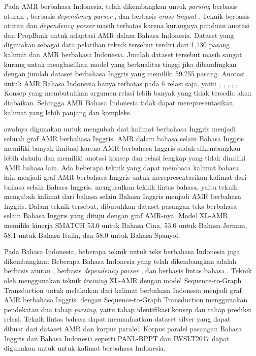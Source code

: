 Pada \gls{AMR} berbahasa Indonesia, telah dikembangkan untuk \textit{parsing} berbasis aturan , berbasis \textit{dependency parser} , dan berbasis \textit{cross-lingual} .
Teknik \amrparsing{} berbasis aturan dan \textit{dependency parser} masih terbatas karena kurangnya panduan anotasi dan PropBank untuk adaptasi \gls{AMR} dalam Bahasa Indonesia.
Dataset yang digunakan sebagai data pelatihan teknik tersebut terdiri dari 1,130 pasang kalimat dan AMR berbahasa Indonesia.
Jumlah dataset tersebut masih sangat kurang untuk menghasilkan model yang berkualitas tinggi jika dibandingkan dengan jumlah dataset berbahasa Inggris yang memiliki 59.255 pasang.
Anotasi untuk \gls{AMR} Bahasa Indonesia hanya terbatas pada 6 relasi saja, yaitu , , , , ,  .
Konsep yang membutuhkan argumen relasi lebih banyak yang tidak tersedia akan diabaikan.
Sehingga AMR Bahasa Indonesia tidak dapat merepresentasikan kalimat yang lebih panjang dan kompleks.

\amrparsing{} awalnya digunakan untuk mengubah dari kalimat berbahasa Inggris menjadi sebuah graf \gls{AMR} berbahasa Inggris.
\gls{AMR} dalam bahasa selain Bahasa Inggris memiliki banyak limitasi karena \gls{AMR} berbahasa Inggris sudah dikembangkan lebih dahulu dan memiliki anotasi konsep dan relasi lengkap yang tidak dimiliki \gls{AMR} bahasa lain.
Ada beberapa teknik yang dapat membaca kalimat bahasa lain menjadi graf \gls{AMR} berbahasa Inggris untuk merepresentasikan kalimat dari bahasa selain Bahasa Inggris.
\textcite{damonte2018} mengusulkan teknik \amrparsing{} lintas bahasa, yaitu teknik mengubah kalimat dari bahasa selain Bahasa Inggris menjadi \gls{AMR} berbahasa Inggris.
Dalam teknik tersebut, dibutuhkan dataset pasangan teks berbahasa selain Bahasa Inggris yang dituju dengan graf \gls{AMR}-nya.
Model \gls{XL-AMR} memiliki kinerja SMATCH 53.0 untuk Bahasa Cina, 53.0 untuk Bahasa Jernam, 58.1 untuk Bahasa Italia, dan 58.0 untuk Bahasa Spanyol.

Pada Bahasa Indonesia, beberapa teknik \amrparsing{} untuk teks berbahasa Indonesia juga dikembangkan.
Beberapa \amrparsing{} Bahasa Indonesia yang telah dikembangkan adalah \amrparsing{} berbasis aturan , berbasis \textit{dependency parser} , dan berbasis lintas bahasa .
Teknik \amrparsing{} oleh \textcite{putra2022} menggunakan teknik \textit{training} \gls{XL-AMR}  dengan model Sequence-to-Graph Transduction  untuk melakukan \amrparsing{} dari kalimat berbahasa Indonesia menjadi graf \gls{AMR} berbahasa Inggris.
\amrparsing{} dengan Sequence-to-Graph Transduction  menggunakan pendekatan dua tahap \textit{parsing}, yaitu tahap identifikasi konsep dan tahap prediksi relasi.
Teknik \amrparsing{} lintas bahasa dapat memanfaatkan dataset silver yang dapat dibuat dari dataset AMR dan korpus paralel.
Korpus paralel pasangan Bahasa Inggris dan Bahasa Indonesia seperti PANL-BPPT  dan IWSLT2017  dapat digunakan untuk \amrparsing{} untuk kalimat berbahasa Indonesia.

